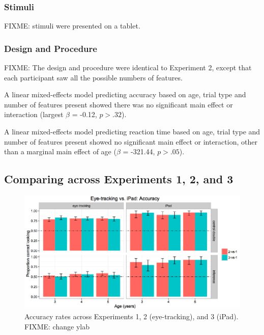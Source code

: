\documentclass[a4paper,man,apacite,floatsintext]{apa6}
\newenvironment{CodeChunk}{}{}
\begin{document}
\subsubsection{Stimuli}\label{stimuli-1}

FIXME: stimuli were presented on a tablet.

\subsubsection{Design and Procedure}\label{design-and-procedure-1}

FIXME: The design and procedure were identical to Experiment 2, except
that each participant saw all the possible numbers of features.

A linear mixed-effects model predicting accuracy based on age, trial
type and number of features present showed there was no significant main
effect or interaction (largest \(\beta\) = -0.12, \(p > .32\)).

A linear mixed-effects model predicting reaction time based on age,
trial type and number of features present showed no significant main
effect or interaction, other than a marginal main effect of age
(\(\beta\) = -321.44, \(p > .05\)).

\subsection{Comparing across Experiments 1, 2, and
3}\label{comparing-across-experiments-1-2-and-3}

\begin{CodeChunk}
\begin{figure}[tb]

{\centering \includegraphics{figs/etip_accuracy-1} 

}

\caption[Accuracy rates across Experiments 1, 2 (eye-tracking), and 3 (iPad)]{Accuracy rates across Experiments 1, 2 (eye-tracking), and 3 (iPad). FIXME: change ylab}\label{fig:etip_accuracy}
\end{figure}
\end{CodeChunk}
\end{document}
